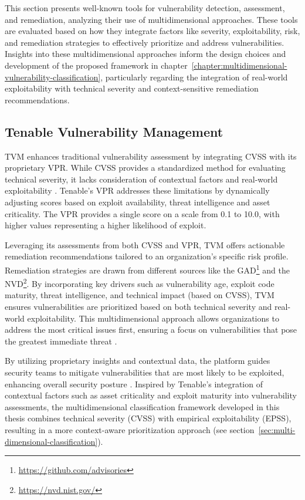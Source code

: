 This section presents well-known tools for vulnerability detection, assessment, and remediation, analyzing their use of multidimensional approaches. These tools are evaluated based on how they integrate factors like severity, exploitability, risk, and remediation strategies to effectively prioritize and address vulnerabilities. Insights into these multidimensional approaches inform the design choices and development of the proposed framework in chapter~\ref{chapter:multidimensional-vulnerability-classification}, particularly regarding the integration of real-world exploitability with technical severity and context-sensitive remediation recommendations.

\subsection{Tenable Vulnerability Management}
\label{subsec:tenable-vulnerability-management}

\ac{TVM} enhances traditional vulnerability assessment by integrating \ac{CVSS} with its proprietary \ac{VPR}. While \ac{CVSS} provides a standardized method for evaluating technical severity, it lacks consideration of contextual factors and real-world exploitability \autocite{spring_time_2021}. Tenable's \ac{VPR} addresses these limitations by dynamically adjusting scores based on exploit availability, threat intelligence and asset criticality. The \ac{VPR} provides a single score on a scale from 0.1 to 10.0, with higher values representing a higher likelihood of exploit.

Leveraging its assessments from both \ac{CVSS} and \ac{VPR}, \ac{TVM} offers actionable remediation recommendations tailored to an organization's specific risk profile. Remediation strategies are drawn from different sources like the \ac{GAD}\footnote{\url{https://github.com/advisories}} and the \ac{NVD}\footnote{\url{https://nvd.nist.gov/}}. By incorporating key drivers such as vulnerability age, exploit code maturity, threat intelligence, and technical impact (based on \ac{CVSS}), \ac{TVM} ensures vulnerabilities are prioritized based on both technical severity and real-world exploitability. This multidimensional approach allows organizations to address the most critical issues first, ensuring a focus on vulnerabilities that pose the greatest immediate threat \autocite{tenable_inc_vulnerability_2024}.

By utilizing proprietary insights and contextual data, the platform guides security teams to mitigate vulnerabilities that are most likely to be exploited, enhancing overall security posture \autocite{tenable_inc_tenable_2024}. Inspired by Tenable's integration of contextual factors such as asset criticality and exploit maturity into vulnerability assessments, the multidimensional classification framework developed in this thesis combines technical severity (\ac{CVSS}) with empirical exploitability (\ac{EPSS}), resulting in a more context-aware prioritization approach (see section~\ref{sec:multi-dimensional-classification}).

